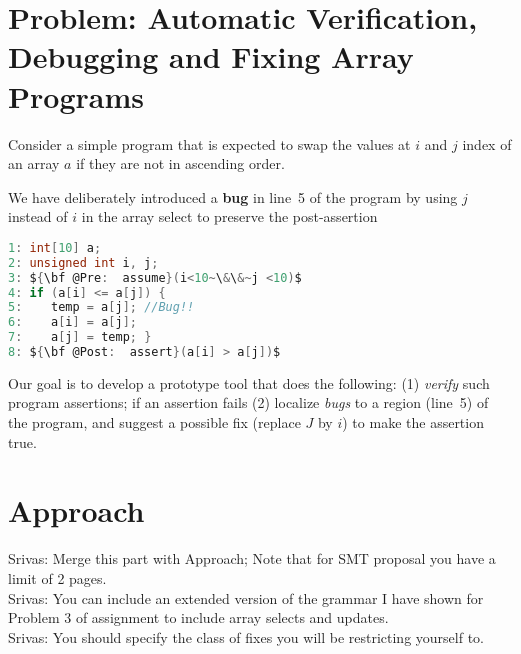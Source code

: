 \documentclass[a4paper, 12pt, notitlepage] {article}
\newcommand{\hide}[1]{}
\newcommand{\mscmt}[1]{{\color{blue} \tiny{Srivas: {#1}}}}
\begin{document}
\section {Problem: Automatic Verification, Debugging and Fixing Array Programs}
\hide{For the demonstration of problem, we shall give an example.}
Consider a simple program that is expected to swap the values at $i$ and $j$ index of an array $a$ if they are not in ascending order.
\hide{We are writing the program in C-like syntax for demonstration only, in practice, the program will be written in the grammar defined by our language with the pre/post conditions.}
We have deliberately introduced a {\bf bug} in line~5 of the program by using $j$ instead of $i$ in the array select to preserve the post-assertion\\ 

\begin{lstlisting}[language=C, mathescape=true]
1: int[10] a;
2: unsigned int i, j;
3: ${\bf @Pre:  assume}(i<10~\&\&~j <10)$
4: if (a[i] <= a[j]) {
5:    temp = a[j]; //Bug!!
6:    a[i] = a[j];
7:    a[j] = temp; }
8: ${\bf @Post:  assert}(a[i] > a[j])$
\end{lstlisting}
$ $\\
Our goal is to develop a prototype tool that does the following:
(1) \emph{verify} such program assertions; if an assertion fails (2) localize \emph{bugs} to a region (line~5) of the program, and suggest a possible fix (replace $J$ by $i$) to make the assertion true.
\section {Approach}

\mscmt{Merge this part with Approach; Note that for SMT proposal you have a limit of 2 pages.} \\
\mscmt{You can include an extended version of the grammar I have shown for Problem 3 of assignment to include array selects and updates.} \\
\mscmt{You should specify the class of fixes you will be restricting yourself to.} \\
\end{document}

